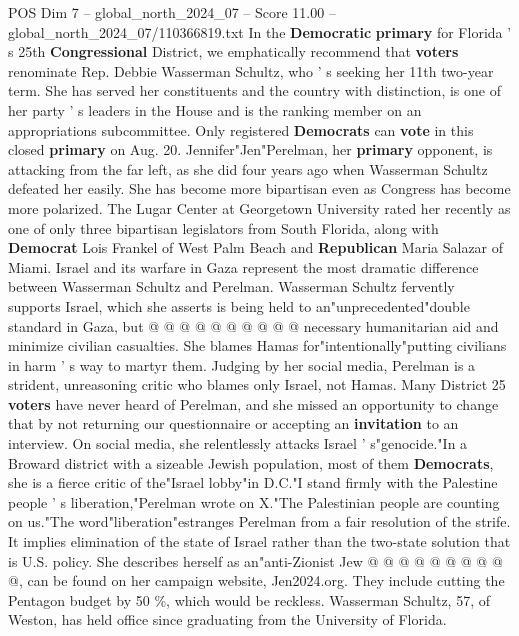 \begin{textsample}{POS Dim 7 – global\_north\_2024\_07 – Score 11.00 – global\_north\_2024\_07/110366819.txt}  \label{ex:f7_pos_048}
In the \textbf{Democratic} \textbf{primary} for Florida ' s 25th \textbf{Congressional} District, we emphatically recommend that \textbf{voters} renominate Rep.
Debbie Wasserman Schultz, who ' s seeking her 11th two-year term.
She has served her constituents and the country with distinction, is one of her party ' s leaders in the House and is the ranking member on an appropriations subcommittee.
Only registered \textbf{Democrats} can \textbf{vote} in this closed \textbf{primary} on Aug. 20.
Jennifer"Jen"Perelman, her \textbf{primary} opponent, is attacking from the far left, as she did four years ago when Wasserman Schultz defeated her easily.
She has become more bipartisan even as Congress has become more polarized.
The Lugar Center at Georgetown University rated her recently as one of only three bipartisan legislators from South Florida, along with \textbf{Democrat} Lois Frankel of West Palm Beach and \textbf{Republican} Maria Salazar of Miami.
Israel and its warfare in Gaza represent the most dramatic difference between Wasserman Schultz and Perelman.
Wasserman Schultz fervently supports Israel, which she asserts is being held to an"unprecedented"double standard in Gaza, but @ @ @ @ @ @ @ @ @ @ necessary humanitarian aid and minimize civilian casualties.
She blames Hamas for"intentionally"putting civilians in harm ' s way to martyr them.
Judging by her social media, Perelman is a strident, unreasoning critic who blames only Israel, not Hamas.
Many District 25 \textbf{voters} have never heard of Perelman, and she missed an opportunity to change that by not returning our questionnaire or accepting an \textbf{invitation} to an interview.
On social media, she relentlessly attacks Israel ' s"genocide."In a Broward district with a sizeable Jewish population, most of them \textbf{Democrats}, she is a fierce critic of the"Israel lobby"in D.C."I stand firmly with the Palestine people ' s liberation,"Perelman wrote on X."The Palestinian people are counting on us."The word"liberation"estranges Perelman from a fair resolution of the strife.
It implies elimination of the state of Israel rather than the two-state solution that is U.S. policy.
She describes herself as an"anti-Zionist Jew @ @ @ @ @ @ @ @ @ @, can be found on her campaign website, Jen2024.org.
They include cutting the Pentagon budget by 50 \%, which would be reckless.
Wasserman Schultz, 57, of Weston, has held office since graduating from the University of Florida.

\end{textsample}

